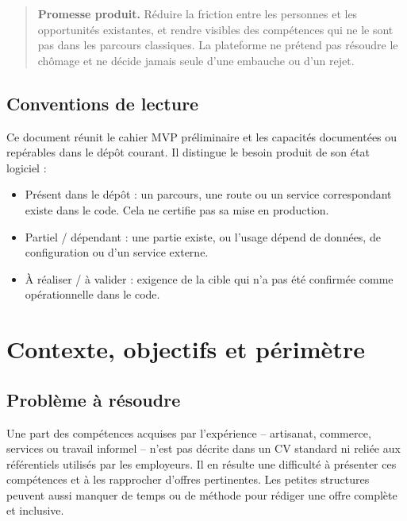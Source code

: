 \documentclass[11pt,a4paper]{article}
\newcommand{\status}[1]{\textsf{\small #1}}
\begin{document}
\begin{quote}
\textbf{Promesse produit.} Réduire la friction entre les personnes et les opportunités existantes, et rendre visibles des compétences qui ne le sont pas dans les parcours classiques. La plateforme ne prétend pas résoudre le chômage et ne décide jamais seule d'une embauche ou d'un rejet.
\end{quote}

\subsection{Conventions de lecture}

Ce document réunit le cahier MVP préliminaire et les capacités documentées ou repérables dans le dépôt courant. Il distingue le besoin produit de son état logiciel :
\begin{itemize}
  \item \colorbox{statusGreen}{\status{Présent dans le dépôt}} : un parcours, une route ou un service correspondant existe dans le code. Cela ne certifie pas sa mise en production.
  \item \colorbox{statusAmber}{\status{Partiel / dépendant}} : une partie existe, ou l'usage dépend de données, de configuration ou d'un service externe.
  \item \colorbox{statusGray}{\status{À réaliser / à valider}} : exigence de la cible qui n'a pas été confirmée comme opérationnelle dans le code.
\end{itemize}

\section{Contexte, objectifs et périmètre}

\subsection{Problème à résoudre}

Une part des compétences acquises par l'expérience -- artisanat, commerce, services ou travail informel -- n'est pas décrite dans un CV standard ni reliée aux référentiels utilisés par les employeurs. Il en résulte une difficulté à présenter ces compétences et à les rapprocher d'offres pertinentes. Les petites structures peuvent aussi manquer de temps ou de méthode pour rédiger une offre complète et inclusive.
\end{document}
